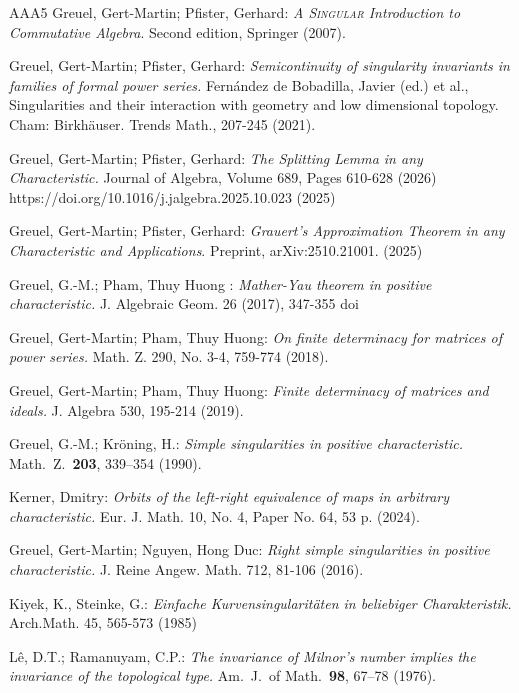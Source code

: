 \documentclass[11pt]{article}
\begin{document}
\begin{thebibliography}{AAA5}
 Greuel, Gert-Martin; Pfister, Gerhard: {\em A \textsc{Singular} Introduction to Commutative Algebra}. Second edition, Springer (2007).

 Greuel, Gert-Martin; Pfister, Gerhard:
 {\em Semicontinuity of singularity invariants in families of formal power series.} 
Fernández de Bobadilla, Javier (ed.) et al., Singularities and their interaction with geometry and low dimensional topology. Cham: Birkhäuser. Trends Math., 207-245 (2021).
 
 Greuel, Gert-Martin; Pfister, Gerhard: {\em The Splitting Lemma in any Characteristic.} 
Journal of Algebra, Volume 689, Pages 610-628 (2026)
https://doi.org/10.1016/j.jalgebra.2025.10.023 (2025)

 Greuel, Gert-Martin; Pfister, Gerhard: {\em Grauert’s Approximation Theorem in
any Characteristic and Applications}. Preprint, arXiv:2510.21001.
(2025)

 Greuel, G.-M.; Pham, Thuy Huong : {\it Mather-Yau theorem in positive characteristic.} J. Algebraic Geom. 26 (2017), 347-355 doi

 Greuel, Gert-Martin; Pham, Thuy Huong:
 \emph{On finite determinacy for matrices of power series.} Math. Z. 290, No. 3-4, 759-774 (2018).  
 
 Greuel, Gert-Martin; Pham, Thuy Huong:
 \emph{Finite determinacy of matrices and ideals.} J. Algebra 530, 195-214 (2019). 
 
    
 Greuel, G.-M.; Kr{\"o}ning, H.: {\it Simple   singularities in positive characteristic.} Math.\ Z.\ {\bf 203},  339--354 (1990).
  
   Kerner, Dmitry: {\it Orbits of the left-right equivalence of maps in arbitrary characteristic.} Eur. J. Math. 10, No. 4, Paper No. 64, 53 p. (2024). 
  
   Greuel, Gert-Martin; Nguyen, Hong Duc:
 \emph{Right simple singularities in positive characteristic.} 
J. Reine Angew. Math. 712, 81-106 (2016). 

 Kiyek, K., Steinke, G.: {\it Einfache Kurvensingularit\"aten in beliebiger Charakteristik.}
Arch.Math. 45, 565-573 (1985)

 L{\^e}, D.T.; Ramanuyam, C.P.: {\it The invariance
    of Milnor's number implies the invariance of the topological
    type.} Am.\ J.\ of Math.\ {\bf 98}, 67--78 (1976).
    

\end{thebibliography}
\end{document}
